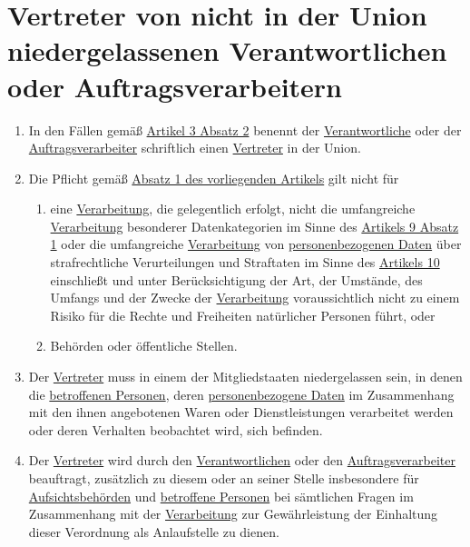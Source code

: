 \chapter{Vertreter von nicht in der Union niedergelassenen Verantwortlichen oder Auftragsverarbeitern}
\label{ch:27}

\begin{enumerate}

  \item In den Fällen gemäß \hyperref[itm:03-2]{Artikel 3 Absatz 2} benennt der \hyperref[itm:04-7]
   {Verantwortliche} oder der
   \hyperref[itm:04-8]{Auftragsverarbeiter} schriftlich einen \hyperref[itm:04-17]{Vertreter} in der Union.%
  \label{itm:27-1}

  \item Die Pflicht gemäß \hyperref[itm:27-1]{Absatz 1 des vorliegenden Artikels} gilt nicht für%
  \label{itm:27-2}

  \begin{enumerate}
  
    \item eine \hyperref[itm:04-2]{Verarbeitung}, die gelegentlich erfolgt, nicht die umfangreiche \hyperref[itm:04-2]
     {Verarbeitung} besonderer Datenkategorien im Sinne des \hyperref[itm:09-1]{Artikels 9 Absatz 1} oder die
     umfangreiche \hyperref[itm:04-2]{Verarbeitung} von \hyperref[itm:04-1]{personenbezogenen Daten} über
     strafrechtliche Verurteilungen und Straftaten im Sinne des \hyperref[ch:10]{Artikels 10} einschließt und unter
     Berücksichtigung der Art, der Umstände, des Umfangs und der Zwecke der \hyperref[itm:04-2]
     {Verarbeitung} voraussichtlich nicht zu einem Risiko für die Rechte und Freiheiten natürlicher Personen führt,
     oder%
    \label{itm:27-2a}

    \item Behörden oder öffentliche Stellen.%
    \label{itm:27-2b}

  \end{enumerate}

  \item Der \hyperref[itm:04-17]{Vertreter} muss in einem der Mitgliedstaaten niedergelassen sein, in denen
   die \hyperref[itm:04-1]{betroffenen Personen}, deren
   \hyperref[itm:04-1]{personenbezogene Daten} im Zusammenhang mit den ihnen angebotenen Waren oder Dienstleistungen
    verarbeitet werden oder deren Verhalten beobachtet wird, sich befinden.%
  \label{itm:27-3}

  \item Der \hyperref[itm:04-17]{Vertreter} wird durch den \hyperref[itm:04-7]{Verantwortlichen} oder den \hyperref
   [itm:04-8]{Auftragsverarbeiter} beauftragt, zusätzlich zu diesem oder an seiner Stelle insbesondere für \hyperref
   [itm:04-21]{Aufsichtsbehörden} und \hyperref[itm:04-1]{betroffene Personen} bei sämtlichen Fragen im Zusammenhang
   mit der \hyperref[itm:04-2]{Verarbeitung} zur Gewährleistung der Einhaltung dieser Verordnung als Anlaufstelle zu
   dienen.%
  \label{itm:27-4}


\end{enumerate}
